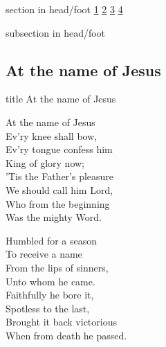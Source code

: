 \documentclass{beamer}
\begin{document}
{
{ 
 {
 \begin{beamercolorbox}[ht=4.5ex,dp=1.5ex,%
      leftskip=.3cm,rightskip=.3cm plus1fil]{section in head/foot}
 \fontsize{12}{25}\selectfont 
\hyperlink{At the name of Jesus[]1}{1}
\hyperlink{At the name of Jesus[]2}{2}
\hyperlink{At the name of Jesus[]3}{3}
\hyperlink{At the name of Jesus[]4}{4}
 
 \end{beamercolorbox}%
  \begin{beamercolorbox}[ht=2.5ex,dp=1.125ex,%
   leftskip=.3cm,rightskip=.3cm plus1fil]{subsection in head/foot}
   \insertauthor
 \end{beamercolorbox}%
 }
}
\subsection{ At the name of Jesus }

\hypertarget{At the name of Jesus[]}{}
\begin{frame}{}
 \vfill
  \centering
  \begin{beamercolorbox}[sep=8pt,center,shadow=true,rounded=true]{title}
    At the name of Jesus     
  \end{beamercolorbox}
  \vfill
\end{frame}

\hypertarget{At the name of Jesus[]1}{}
\begin{frame}{}
\fontsize{ 18 }{ 23 }\selectfont

At the name of Jesus\\ 
Ev'ry knee shall bow,\\ 
Ev'ry tongue confess him\\ 
King of glory now;\\ 
'Tis the Father's pleasure\\ 
We should call him Lord,\\ 
Who from the beginning\\ 
Was the mighty Word. 

\end{frame}

\hypertarget{At the name of Jesus[]2}{}
\begin{frame}{}
\fontsize{ 18 }{ 23 }\selectfont

Humbled for a season\\ 
To receive a name\\ 
From the lips of sinners,\\ 
Unto whom he came.\\ 
Faithfully he bore it,\\ 
Spotless to the last,\\ 
Brought it back victorious\\ 
When from death he passed. 


\end{frame}}
\end{document}
